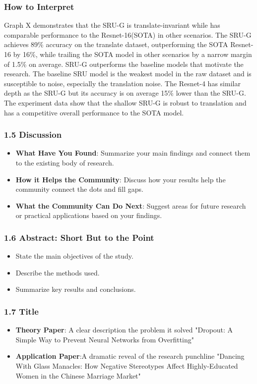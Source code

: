 \documentclass{beamer}
\begin{document}
  
  \begin{frame}
  \frametitle{How to Interpret}
      Graph X demonstrates that the SRU-G is translate-invariant while has comparable performance to the Resnet-16(SOTA) in other scenarios.
      The SRU-G achieves 89\% accuracy on the translate dataset, outperforming the SOTA Resnet-16 by 16\%, while trailing the SOTA model in other scenarios by a narrow margin of 1.5\% on average.
      SRU-G outperforms the baseline models that motivate the research. The baseline SRU model is the weakest model in the raw dataset and is susceptible to noise, especially the translation noise. The Resnet-4 has similar depth as the SRU-G but its accuracy is on average 15\% lower than the SRU-G.
      The experiment data show that the shallow SRU-G is robust to translation and has a competitive overall performance to the SOTA model.
  \end{frame}
  
  \begin{frame}
    \frametitle{1.5 Discussion}
    \begin{itemize}
        \item \textbf{What Have You Found}: Summarize your main findings and connect them to the existing body of research.
        \item \textbf{How it Helps the Community}: Discuss how your results help the community connect the dots and fill gaps.
        \item \textbf{What the Community Can Do Next}: Suggest areas for future research or practical applications based on your findings.
    \end{itemize}
    \end{frame}
    
    \begin{frame}
    \frametitle{1.6 Abstract: Short But to the Point}
    \begin{itemize}
        \item State the main objectives of the study.
        \item Describe the methods used.
        \item Summarize key results and conclusions.
    \end{itemize}
    \end{frame}
    
    \begin{frame}
    \frametitle{1.7 Title}
    \begin{itemize}[<+->]
        \item \textbf{Theory Paper}: A clear description the problem it solved
        \newline"Dropout: A Simple Way to Prevent Neural Networks from Overfitting"
        \item \textbf{Application Paper}:A dramatic reveal of the research punchline
        \newline "Dancing With Glass Manacles: How Negative Stereotypes Affect Highly-Educated Women in the Chinese Marriage Market"
    \end{itemize}
    \end{frame}
    
\end{document}

